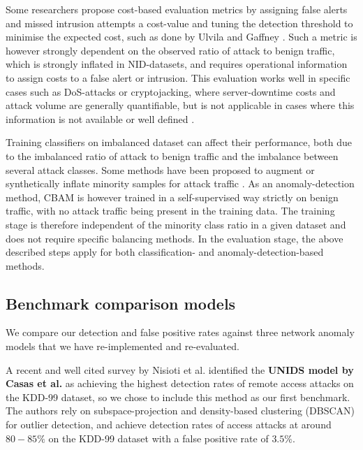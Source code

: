 Some researchers propose cost-based evaluation metrics by assigning false alerts and missed intrusion attempts a cost-value and tuning the detection threshold to minimise the expected cost, such as done by Ulvila and Gaffney \cite{ulvila2003evaluation}. Such a metric is however strongly dependent on the observed ratio of attack to benign traffic, which is strongly inflated in NID-datasets, and requires operational information to assign costs to a false alert or intrusion. This evaluation works well in specific cases such as DoS-attacks or cryptojacking, where server-downtime costs and attack volume are generally quantifiable, but is not applicable in cases where this information is not available or well defined \cite{milenkoski2015evaluating}. 

Training classifiers on imbalanced dataset can affect their performance, both due to the imbalanced ratio of attack to benign traffic and the imbalance between several attack classes. Some methods have been proposed to augment or synthetically inflate minority samples for attack traffic \cite{liu2020intrusion}. As an anomaly-detection method, CBAM is however trained in a self-supervised way strictly on benign traffic, with no attack traffic being present in the training data. The training stage is therefore independent of the minority class ratio in a given dataset and does not require specific balancing methods. In the evaluation stage, the above described steps apply for both classification- and anomaly-detection-based methods.


\subsection{Benchmark comparison models}\label{Sec:Benchmark}

We compare our detection and false positive rates against three network anomaly models that we have re-implemented and re-evaluated. 

A recent and well cited survey by Nisioti et al. \cite{nisioti2018intrusion} identified the \textbf{UNIDS model by Casas et al.} \cite{casas2012unsupervised} as achieving the highest detection rates of remote access attacks on the KDD-99 dataset, so we chose to include this method as our first benchmark. The authors rely on subspace-projection and density-based clustering (DBSCAN) for outlier detection, and %
achieve detection rates of access attacks at around $80-85\%$ on the KDD-99 dataset with a false positive rate of $3.5\%$. %

